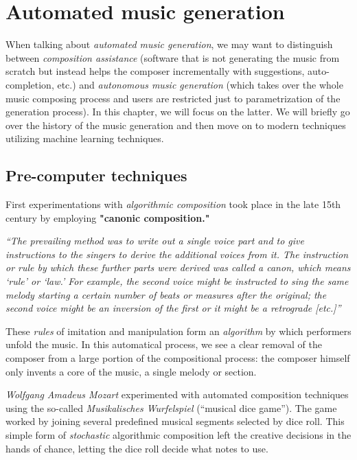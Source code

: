 \chapter{Automated music generation}\label{ch:automated-music-generation}

\begin{chapterabstract}
    When talking about \textit{automated music generation}, we may want to distinguish between \textit{composition assistance} (software that is not generating the music from scratch but instead helps the composer incrementally with suggestions, auto-completion, etc.) and \textit{autonomous music generation} (which takes over the whole music composing process and users are restricted just to parametrization of the generation process).
    In this chapter, we will focus on the latter.
    We will briefly go over the history of the music generation and then move on to modern techniques utilizing machine learning techniques.~\cite{music-generation-history}
\end{chapterabstract}


\section{Pre-computer techniques}\label{sec:pre-computer-techniques}

First experimentations with \textit{algorithmic composition} took place in the late 15th century by employing \textbf{"canonic composition."}~\cite{brief-history-of-algo-composition}

\textit{``The prevailing method was to write out a single voice part and to give instructions to the singers to derive the additional voices from it.
The instruction or rule by which these further parts were derived was called a canon, which means `rule' or `law.' For example, the second voice might be instructed to sing the same melody starting a certain number of beats or measures after the original;
the second voice might be an inversion of the first or it might be a retrograde [etc.]''}~\cite{history-of-western-music}

These \textit{rules} of imitation and manipulation form an \textit{algorithm} by which performers unfold the music.
In this automatical process, we see a clear removal of the composer from a large portion of the compositional process: the composer himself only invents a core of the music, a single melody or section.~\cite{brief-history-of-algo-composition}

\textit{Wolfgang Amadeus Mozart} experimented with automated composition techniques using the so-called \textit{Musikalisches Wurfelspiel} (``musical dice game'').
The game worked by joining several predefined musical segments selected by dice roll.
This simple form of \textit{stochastic} algorithmic composition left the creative decisions in the hands of chance, letting the dice roll decide what notes to use.~\cite{brief-history-of-algo-composition}


